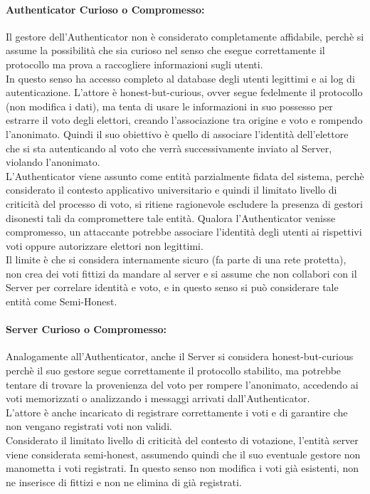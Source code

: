		\paragraph{Authenticator Curioso o Compromesso:}
		Il gestore dell'Authenticator non è considerato completamente affidabile, perchè si assume la possibilità che sia curioso nel senso che esegue correttamente il protocollo ma prova a raccogliere informazioni sugli utenti.\\
		In questo senso ha accesso completo al database degli utenti legittimi e ai log di autenticazione. L'attore è honest-but-curious, ovver segue fedelmente il protocollo (non modifica i dati), ma tenta di usare le informazioni in suo possesso per estrarre il voto degli elettori, creando l'associazione tra origine e voto e rompendo l'anonimato. Quindi il suo obiettivo è quello di associare l'identità dell'elettore che si sta autenticando al voto che verrà successivamente inviato al Server, violando l'anonimato.\\
		L’Authenticator viene assunto come entità parzialmente fidata del sistema, perchè considerato il contesto applicativo universitario e quindi il limitato livello di criticità del processo di voto, si ritiene ragionevole escludere la presenza di gestori disonesti tali da compromettere tale entità. Qualora l’Authenticator venisse compromesso, un attaccante potrebbe associare l’identità degli utenti ai rispettivi voti oppure autorizzare elettori non legittimi.\\
		Il limite è che si considera internamente sicuro (fa parte di una rete protetta), non crea dei voti fittizi da mandare al server e si assume che non collabori con il Server per correlare identità e voto, e in questo senso si può considerare tale entità come Semi-Honest.
		
		\paragraph{Server Curioso o Compromesso:}
		Analogamente all'Authenticator, anche il Server si considera honest-but-curious perchè il suo gestore segue correttamente il protocollo stabilito, ma potrebbe tentare di trovare la provenienza del voto per rompere l'anonimato, accedendo ai voti memorizzati o analizzando i messaggi arrivati dall'Authenticator.\\
		L'attore è anche incaricato di registrare correttamente i voti e di garantire che non vengano registrati voti non validi.  \\
		Considerato il limitato livello di criticità del contesto di votazione, l'entità server viene considerata semi-honest, assumendo quindi che il suo eventuale gestore non manometta i voti registrati. In questo senso non modifica i voti già esistenti, non ne inserisce di fittizi e non ne elimina di già registrati.
	


